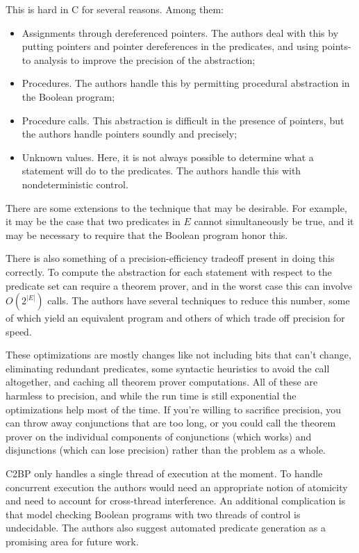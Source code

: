 \documentclass{article}
\begin{document}
\begin{multicols}{2}
This is hard in C for several reasons.  Among them:
\begin{itemize}
\item Assignments through dereferenced pointers.  The authors deal
  with this by putting pointers and pointer dereferences in the
  predicates, and using points-to analysis to improve the precision of
  the abstraction;
\item Procedures.  The authors handle this by permitting procedural
  abstraction in the Boolean program;
\item Procedure calls.  This abstraction is difficult in the presence
  of pointers, but the authors handle pointers soundly and precisely;
\item Unknown values.  Here, it is not always possible to determine
  what a statement will do to the predicates.  The authors handle this
  with nondeterministic control.
\end{itemize}
There are some extensions to the technique that may be desirable.  For
example, it may be the case that two predicates in $E$ cannot
simultaneously be true, and it may be necessary to require that the
Boolean program honor this.

There is also something of a precision-efficiency tradeoff present in
doing this correctly.  To compute the abstraction for each statement
with respect to the predicate set can require a theorem prover, and in
the worst case this can involve $O(2^{|E|})$ calls.  The authors have
several techniques to reduce this number, some of which yield an
equivalent program and others of which trade off precision for speed.

These optimizations are mostly changes like not including bits that
can't change, eliminating redundant predicates, some syntactic
heuristics to avoid the call altogether, and caching all theorem
prover computations.  All of these are harmless to precision, and
while the run time is still exponential the optimizations help most of
the time.  If you're willing to sacrifice precision, you can throw
away conjunctions that are too long, or you could call the theorem
prover on the individual components of conjunctions (which works) and
disjunctions (which can lose precision) rather than the problem as a
whole.

C2BP only handles a single thread of execution at the moment.  To
handle concurrent execution the authors would need an appropriate
notion of atomicity and need to account for cross-thread interference.
An additional complication is that model checking Boolean programs
with two threads of control is undecidable.  The authors also suggest
automated predicate generation as a promising area for future work.


\end{multicols}
\end{document}
